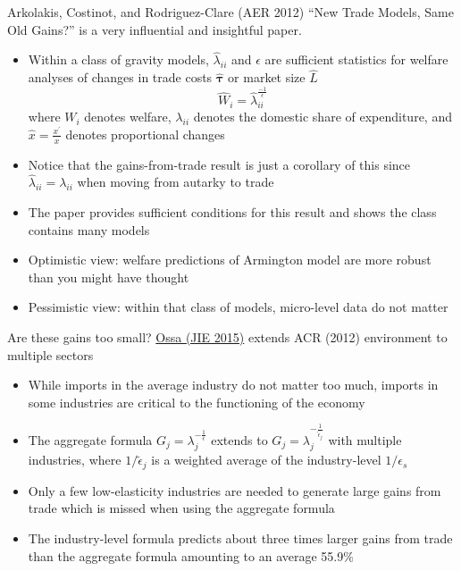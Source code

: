 \documentclass[10pt,notes=hide,aspectratio=169]{beamer}
\begin{document}
\begin{frame}{Arkolakis, Costinot, and Rodriguez-Clare (AER 2012)}
``New Trade Models, Same Old Gains?'' is a very influential and insightful paper.
\begin{itemize}
\item Within a class of gravity models, $\widehat{\lambda}_{ii}$ and $\epsilon$ are sufficient statistics for welfare analyses of changes in trade costs $\hat{\mathbf{\tau}}$ or market size $\hat{L}$
\begin{equation*}
\widehat{W}_{i}=\widehat{\lambda}_{ii}^{\frac{-1}{\epsilon}}
\end{equation*}
where $W_{i}$ denotes welfare, $\lambda_{ii}$ denotes the domestic share of expenditure, and $\widehat{x}=\frac{x^{\prime}}{x}$ denotes proportional changes
\item Notice that the gains-from-trade result is just a corollary of this since $\widehat{\lambda}_{ii}=\lambda _{ii}$ when moving from autarky to trade
	\item The paper provides sufficient conditions for this result and shows the class contains many models
	\item Optimistic view: welfare predictions of Armington model are more robust than you might have thought
	\item Pessimistic view: within that class of models, micro-level data do not matter
\end{itemize}
\end{frame}
\begin{frame}{Are these gains too small?}
\href{https://doi.org/10.1016/j.jinteco.2015.07.002}{Ossa (JIE 2015)} extends ACR (2012) environment to multiple sectors
\begin{itemize}
\item While imports in the average industry do not matter too much, imports
in some industries are critical to the functioning of the economy
\item The aggregate formula $G_{j}=\lambda _{j}^{-\frac{1}{\epsilon }}$
extends to $G_{j}=\lambda _{j}^{-\frac{1}{\tilde{\epsilon}_{j}}}$ with
multiple industries, where $1/\tilde{\epsilon}_{j}$ is a weighted average
of the industry-level $1/\epsilon _{s}$
\item Only a few low-elasticity industries are needed to generate large
gains from trade which is missed when using the aggregate formula
\item The industry-level formula predicts about three times larger gains
from trade than the aggregate formula amounting to an average 55.9\%
\end{itemize}
\end{frame}
\end{document}
